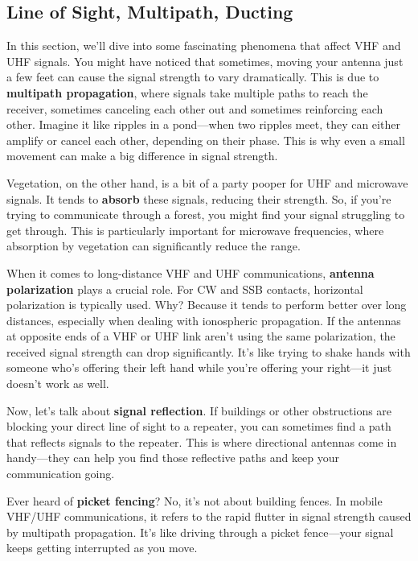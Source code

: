 \subsection{Line of Sight, Multipath, Ducting}
\label{subsec:los-multipath}

In this section, we'll dive into some fascinating phenomena that affect VHF and UHF signals. You might have noticed that sometimes, moving your antenna just a few feet can cause the signal strength to vary dramatically. This is due to \textbf{multipath propagation}, where signals take multiple paths to reach the receiver, sometimes canceling each other out and sometimes reinforcing each other. Imagine it like ripples in a pond—when two ripples meet, they can either amplify or cancel each other, depending on their phase. This is why even a small movement can make a big difference in signal strength.

Vegetation, on the other hand, is a bit of a party pooper for UHF and microwave signals. It tends to \textbf{absorb} these signals, reducing their strength. So, if you're trying to communicate through a forest, you might find your signal struggling to get through. This is particularly important for microwave frequencies, where absorption by vegetation can significantly reduce the range.

When it comes to long-distance VHF and UHF communications, \textbf{antenna polarization} plays a crucial role. For CW and SSB contacts, horizontal polarization is typically used. Why? Because it tends to perform better over long distances, especially when dealing with ionospheric propagation. If the antennas at opposite ends of a VHF or UHF link aren't using the same polarization, the received signal strength can drop significantly. It's like trying to shake hands with someone who's offering their left hand while you're offering your right—it just doesn't work as well.

Now, let's talk about \textbf{signal reflection}. If buildings or other obstructions are blocking your direct line of sight to a repeater, you can sometimes find a path that reflects signals to the repeater. This is where directional antennas come in handy—they can help you find those reflective paths and keep your communication going.

Ever heard of \textbf{picket fencing}? No, it's not about building fences. In mobile VHF/UHF communications, it refers to the rapid flutter in signal strength caused by multipath propagation. It's like driving through a picket fence—your signal keeps getting interrupted as you move.

